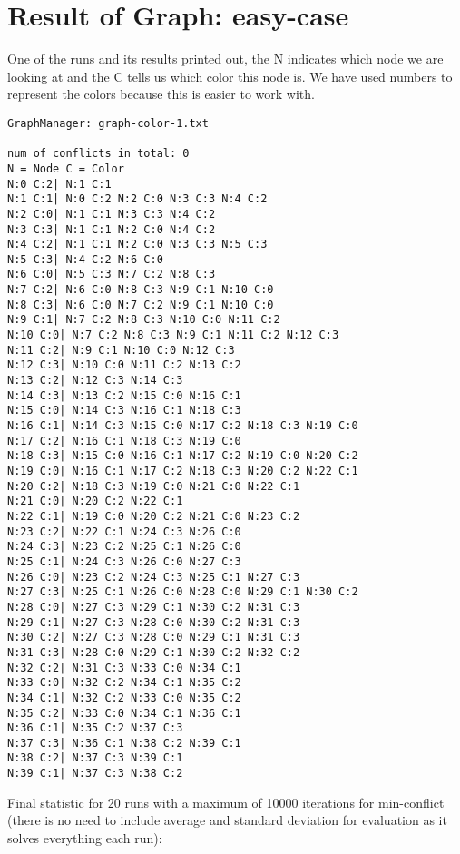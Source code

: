 \documentclass[12pt, a4paper]{article}
\begin{document}
\section{Result of Graph: easy-case}
One of the runs and its results printed out, the N indicates which node we are looking at and the C tells us which color this node is. We have used numbers to represent the colors because this is easier to work with.\\
\begin{verbatim}
GraphManager: graph-color-1.txt

num of conflicts in total: 0
N = Node C = Color
N:0 C:2| N:1 C:1 
N:1 C:1| N:0 C:2 N:2 C:0 N:3 C:3 N:4 C:2 
N:2 C:0| N:1 C:1 N:3 C:3 N:4 C:2 
N:3 C:3| N:1 C:1 N:2 C:0 N:4 C:2 
N:4 C:2| N:1 C:1 N:2 C:0 N:3 C:3 N:5 C:3 
N:5 C:3| N:4 C:2 N:6 C:0 
N:6 C:0| N:5 C:3 N:7 C:2 N:8 C:3 
N:7 C:2| N:6 C:0 N:8 C:3 N:9 C:1 N:10 C:0 
N:8 C:3| N:6 C:0 N:7 C:2 N:9 C:1 N:10 C:0 
N:9 C:1| N:7 C:2 N:8 C:3 N:10 C:0 N:11 C:2 
N:10 C:0| N:7 C:2 N:8 C:3 N:9 C:1 N:11 C:2 N:12 C:3 
N:11 C:2| N:9 C:1 N:10 C:0 N:12 C:3 
N:12 C:3| N:10 C:0 N:11 C:2 N:13 C:2 
N:13 C:2| N:12 C:3 N:14 C:3 
N:14 C:3| N:13 C:2 N:15 C:0 N:16 C:1 
N:15 C:0| N:14 C:3 N:16 C:1 N:18 C:3 
N:16 C:1| N:14 C:3 N:15 C:0 N:17 C:2 N:18 C:3 N:19 C:0 
N:17 C:2| N:16 C:1 N:18 C:3 N:19 C:0 
N:18 C:3| N:15 C:0 N:16 C:1 N:17 C:2 N:19 C:0 N:20 C:2 
N:19 C:0| N:16 C:1 N:17 C:2 N:18 C:3 N:20 C:2 N:22 C:1 
N:20 C:2| N:18 C:3 N:19 C:0 N:21 C:0 N:22 C:1 
N:21 C:0| N:20 C:2 N:22 C:1 
N:22 C:1| N:19 C:0 N:20 C:2 N:21 C:0 N:23 C:2 
N:23 C:2| N:22 C:1 N:24 C:3 N:26 C:0 
N:24 C:3| N:23 C:2 N:25 C:1 N:26 C:0 
N:25 C:1| N:24 C:3 N:26 C:0 N:27 C:3 
N:26 C:0| N:23 C:2 N:24 C:3 N:25 C:1 N:27 C:3 
N:27 C:3| N:25 C:1 N:26 C:0 N:28 C:0 N:29 C:1 N:30 C:2 
N:28 C:0| N:27 C:3 N:29 C:1 N:30 C:2 N:31 C:3 
N:29 C:1| N:27 C:3 N:28 C:0 N:30 C:2 N:31 C:3 
N:30 C:2| N:27 C:3 N:28 C:0 N:29 C:1 N:31 C:3 
N:31 C:3| N:28 C:0 N:29 C:1 N:30 C:2 N:32 C:2 
N:32 C:2| N:31 C:3 N:33 C:0 N:34 C:1 
N:33 C:0| N:32 C:2 N:34 C:1 N:35 C:2 
N:34 C:1| N:32 C:2 N:33 C:0 N:35 C:2 
N:35 C:2| N:33 C:0 N:34 C:1 N:36 C:1 
N:36 C:1| N:35 C:2 N:37 C:3 
N:37 C:3| N:36 C:1 N:38 C:2 N:39 C:1 
N:38 C:2| N:37 C:3 N:39 C:1 
N:39 C:1| N:37 C:3 N:38 C:2 
\end{verbatim}
\noindent
Final statistic for 20 runs with a maximum of 10000 iterations for min-conflict (there is no need to include average and standard deviation for evaluation as it solves everything each run):
\end{document}
